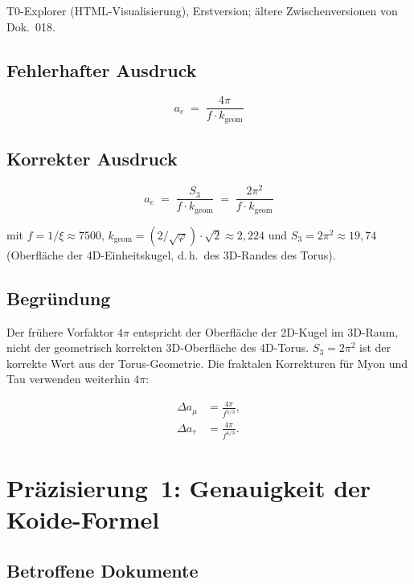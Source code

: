 T0-Explorer (HTML-Visualisierung), Erstversion; ältere Zwischenversionen
von Dok.~018.

\subsection*{Fehlerhafter Ausdruck}

\begin{equation}
  a_e \;=\; \frac{4\pi}{f \cdot k_{\text{geom}}}
  \tag{alt -- falsch}
\end{equation}

\subsection*{Korrekter Ausdruck}

\begin{equation}
  \boxed{
    a_e \;=\; \frac{S_3}{f \cdot k_{\text{geom}}}
    \;=\; \frac{2\pi^2}{f \cdot k_{\text{geom}}}
  }
  \tag{190.4}
\end{equation}

mit $f = 1/\xi \approx 7500$, $k_{\text{geom}} = (2/\sqrt{\varphi})\cdot\sqrt{2} \approx 2{,}224$
und $S_3 = 2\pi^2 \approx 19{,}74$ (Oberfläche der 4D-Einheitskugel,
d.\,h.\ des 3D-Randes des Torus).

\subsection*{Begründung}

Der frühere Vorfaktor $4\pi$ entspricht der Oberfläche der 2D-Kugel im
3D-Raum, nicht der geometrisch korrekten 3D-Oberfläche des 4D-Torus.
$S_3 = 2\pi^2$ ist der korrekte Wert aus der Torus-Geometrie. Die
fraktalen Korrekturen für Myon und Tau verwenden weiterhin $4\pi$:

\begin{align}
  \Delta a_\mu  &= \frac{4\pi}{f^{5/3}}, \tag{190.5}\\
  \Delta a_\tau &= \frac{4\pi}{f^{4/3}}. \tag{190.6}
\end{align}

\section{Präzisierung~1: Genauigkeit der Koide-Formel}

\subsection*{Betroffene Dokumente}

